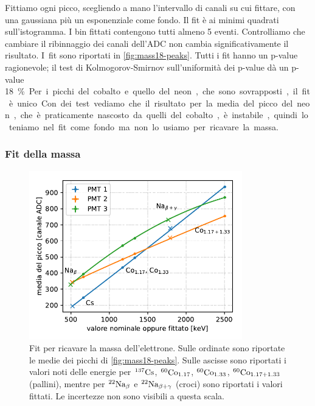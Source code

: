 Fittiamo ogni picco, scegliendo a mano l'intervallo di canali su cui fittare,
con una gaussiana più un esponenziale come fondo.
Il fit è ai minimi quadrati sull'istogramma.
I bin fittati contengono tutti almeno 5 eventi.
Controlliamo che cambiare il ribinnaggio dei canali dell'ADC non cambia significativamente il risultato.
I~fit sono riportati in \autoref{fig:mass18-peaks}.
Tutti i fit hanno un p-value ragionevole;
il test di Kolmogorov-Smirnov sull'uniformità dei p-value dà un p-value \SI{18}\%.
Per i picchi del cobalto e quello del neon, che sono sovrapposti, il fit è unico.
Con dei test vediamo che il risultato per la media del picco del neon,
che è praticamente nascosto da quelli del cobalto,
è instabile, quindi lo teniamo nel fit come fondo ma non lo usiamo per ricavare la massa.

\subsubsection{Fit della massa}

\begin{figure}
	\centering
	\includegraphics[width=25em]{immagini/mass18-cal}
	\caption{\label{fig:mass18-cal}
	Fit per ricavare la massa dell'elettrone.
	Sulle ordinate sono riportate le medie dei picchi di \autoref{fig:mass18-peaks}.
	Sulle ascisse sono riportati i valori noti delle energie
	per $^{\text{137}}\text{Cs}$, $^{\text{60}}\text{Co}_{1.17}$, $^{\text{60}}\text{Co}_{1.33}$, $^{\text{60}}\text{Co}_{1.17+1.33}$ (pallini),
	mentre per $^{\text{22}}\text{Na}_\beta$ e $^{\text{22}}\text{Na}_{\beta+\gamma}$ (croci) sono riportati i valori fittati.
	Le incertezze non sono visibili a questa scala.}
\end{figure}

